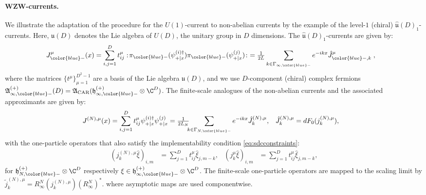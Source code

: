 \documentclass[a4paper, 11pt]{article}
\newcommand{\fA}{\mathfrak{A}}\newcommand{\cA}{\mathcal{A}}\newcommand{\dA}{\mathds{A}}\newcommand{\sA}{\mathscr{A}}
\newcommand{\fh}{\mathfrak{h}}
\newcommand{\fu}{\mathfrak{u}}
\DeclareMathOperator{\1}{\mathds{1}}
\DeclareMathOperator{\CAR}{\textup{CAR}}
\begin{document}
\paragraph{WZW-currents.}
We illustrate the adaptation of the procedure for the $U(1)$-current to non-abelian currents by the example of the level-$1$ (chiral) $\hat{\fu}(D)_{1}$-currents. Here, $\fu(D)$ denotes the Lie algebra of $U(D)$, the unitary group in $D$ dimensions. The $\hat{\fu}(D)_{1}$-currents are given by:
\begin{align}
\label{eq:WZWcur}
J^{\mu}_{{\color{blue}-}}(x) & = \sum_{i,j=1}^{D}t^{\mu}_{ij}:\!\pi_{{\color{blue}-}}(\psi^{(i)\dag}_{+|x})\pi_{{\color{blue}-}}(\psi^{(j)}_{+|x})\!:\ = \tfrac{1}{2L}\sum_{k\in\Gamma_{\infty,{\color{blue}-}}}e^{-ikx}\hat{J}^{\mu}_{{\color{blue}-},k}\;,
\end{align}
where the matrices $\{t^{\mu}\}_{\mu=1}^{D^2-1}$ are a basis of the Lie algebra $\fu(D)$, and we use $D$-component (chiral) complex fermions $\fA^{(+)}_{\infty,{\color{blue}-}}(D)=\fA_{\CAR}(\fh^{(+)}_{\infty,{\color{blue}-}}\otimes\C^{D})$. The finite-scale analogues of the non-abelian currents and the associated approximants are given by:
\begin{align}
\label{eq:WZWcurfinite}
J^{(N),\mu}(x) & = \sum_{i,j=1}^{D}t^{\mu}_{ij}\psi^{(i)\dag}_{+|x}\psi^{(j)}_{+|x} = \tfrac{1}{2L_{N}}\!\!\!\sum_{k\in\Gamma_{N,{\color{blue}-}}}e^{-ikx}\hat{J}^{(N),\mu}_{k}, & \hat{J}^{(N),\mu}_{k} & = dF_{0}(j^{(N),\mu}_{k}),
\end{align}
with the one-particle operators that also satisfy the implementability condition \eqref{eq:sdcconstraints}:
\begin{align}
\label{eq:WZWcur1p}
(j^{(N),\mu}_{k}\hat{\xi})_{i,m} & = \sum_{j=1}^{D}t^{\mu}_{ij}\hat{\xi}_{j,m-k}, & (j^{\mu}_{k}\hat{\xi})_{i,m} & = \sum_{j=1}^{D}t^{\mu}_{ij}\hat{\xi}_{j,m-k},
\end{align}
for $\fh^{(+)}_{N,{\color{blue}-}}\otimes\C^{D}$ respectively $\xi\in\fh^{(+)}_{\infty,{\color{blue}-}}\otimes\C^{D}$. The finite-scale one-particle operators are mapped to the scaling limit by $\tilde{j}^{(N),\mu}_{k} = R^{N}_{\infty}(j^{(N),\mu}_{k})(R^{N}_{\infty})^{*}$. where asymptotic maps are used componentwise.
\end{document}
